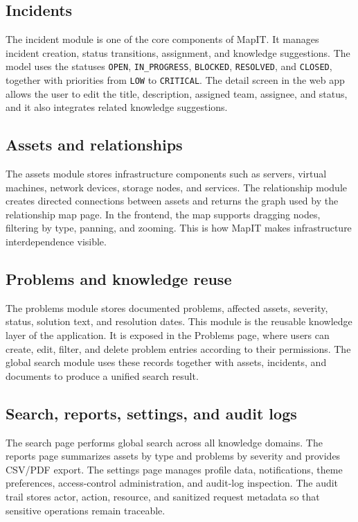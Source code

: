 \subsection{Incidents}
The incident module is one of the core components of MapIT. It manages incident creation, status transitions, assignment, and knowledge suggestions. The model uses the statuses \texttt{OPEN}, \texttt{IN\_PROGRESS}, \texttt{BLOCKED}, \texttt{RESOLVED}, and \texttt{CLOSED}, together with priorities from \texttt{LOW} to \texttt{CRITICAL}. The detail screen in the web app allows the user to edit the title, description, assigned team, assignee, and status, and it also integrates related knowledge suggestions.

\subsection{Assets and relationships}
The assets module stores infrastructure components such as servers, virtual machines, network devices, storage nodes, and services. The relationship module creates directed connections between assets and returns the graph used by the relationship map page. In the frontend, the map supports dragging nodes, filtering by type, panning, and zooming. This is how MapIT makes infrastructure interdependence visible.

\subsection{Problems and knowledge reuse}
The problems module stores documented problems, affected assets, severity, status, solution text, and resolution dates. This module is the reusable knowledge layer of the application. It is exposed in the Problems page, where users can create, edit, filter, and delete problem entries according to their permissions. The global search module uses these records together with assets, incidents, and documents to produce a unified search result.

\subsection{Search, reports, settings, and audit logs}
The search page performs global search across all knowledge domains. The reports page summarizes assets by type and problems by severity and provides CSV/PDF export. The settings page manages profile data, notifications, theme preferences, access-control administration, and audit-log inspection. The audit trail stores actor, action, resource, and sanitized request metadata so that sensitive operations remain traceable.

